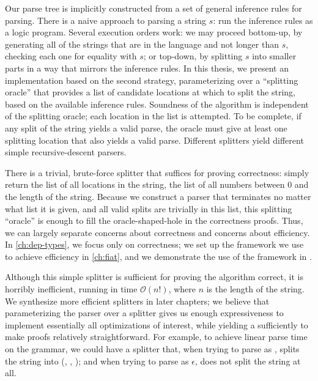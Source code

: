   Our parse tree is implicitly constructed from a set of general inference rules for parsing.  There is a naive approach to parsing a string $s$: run the inference rules as a logic program.  Several execution orders work: we may proceed bottom-up, by generating all of the strings that are in the language and not longer than $s$, checking each one for equality with $s$; or top-down, by splitting $s$ into smaller parts in a way that mirrors the inference rules.  In this thesis, we present an implementation based on the second strategy, parameterizing over a ``splitting oracle'' that provides a list of candidate locations at which to split the string, based on the available inference rules.  Soundness of the algorithm is independent of the splitting oracle; each location in the list is attempted.  To be complete, if any split of the string yields a valid parse, the oracle must give at least one splitting location that also yields a valid parse.  Different splitters yield different simple recursive-descent parsers. \label{sec:splitting-oracle} %

  There is a trivial, brute-force splitter that suffices for proving correctness: simply return the list of all locations in the string, the list of all numbers between 0 and the length of the string.  Because we construct a parser that terminates no matter what list it is given, and all valid splits are trivially in this list, this splitting ``oracle'' is enough to fill the oracle-shaped-hole in the correctness proofs.  Thus, we can largely separate concerns about correctness and concerns about efficiency.  In \autoref{ch:dep-types}, we focus only on correctness; we set up the framework we use to achieve efficiency in \autoref{ch:fiat}, and we demonstrate the use of the framework in .

  Although this simple splitter is sufficient for proving the algorithm correct, it is horribly inefficient, running in time $\mathcal O(n!)$, where $n$ is the length of the string.  We synthesize more efficient splitters in later chapters; we believe that parameterizing the parser over a splitter gives us enough expressiveness to implement essentially all optimizations of interest, while yielding a sufficiently  to make proofs relatively straightforward.  For example, to achieve linear parse time on the  grammar, we could have a splitter that, when trying to parse  as , splits the string into (, , ); and when trying to parse  as $\epsilon$, does not split the string at all.
  
